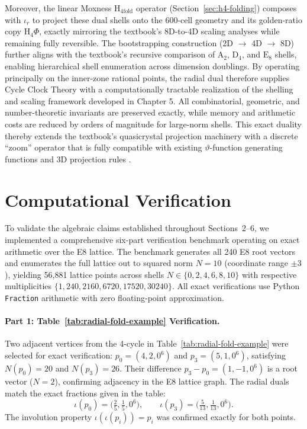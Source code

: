 \documentclass{article}
\begin{document}
Moreover, the linear Moxness \(\mathrm{H}_{4\mathrm{fold}}\) operator (Section~\ref{sec:h4-folding}) composes with \(\iota_r\) to project these dual shells onto the 600-cell geometry and its golden-ratio copy \(\mathrm{H}_4\Phi\), exactly mirroring the textbook’s 8D-to-4D scaling analyses while remaining fully reversible. The bootstrapping construction (2D \(\to\) 4D \(\to\) 8D) further aligns with the textbook’s recursive comparison of \(\mathrm{A}_2\), \(\mathrm{D}_4\), and \(\mathrm{E}_8\) shells, enabling hierarchical shell enumeration across dimension doublings.
By operating principally on the inner-zone rational points, the radial dual therefore supplies Cycle Clock Theory with a computationally tractable realization of the shelling and scaling framework developed in Chapter 5. All combinatorial, geometric, and number-theoretic invariants are preserved exactly, while memory and arithmetic costs are reduced by orders of magnitude for large-norm shells. This exact duality thereby extends the textbook’s quasicrystal projection machinery with a discrete “zoom” operator that is fully compatible with existing \(\vartheta\)-function generating functions and 3D projection rules \cite{FangIrwin2024,ClawsonFangIrwin2024}.
\section{Computational Verification}
\label{sec:computational-verification}
To validate the algebraic claims established throughout Sections~2--6, we implemented a comprehensive six-part verification benchmark operating on exact arithmetic over the E8 lattice. The benchmark generates all 240 E8 root vectors and enumerates the full lattice out to squared norm $N = 10$ (coordinate range $\pm 3$), yielding 56{,}881 lattice points across shells $N \in \{0, 2, 4, 6, 8, 10\}$ with respective multiplicities $\{1, 240, 2160, 6720, 17520, 30240\}$. All exact verifications use Python \texttt{Fraction} arithmetic with zero floating-point approximation.

\paragraph{Part 1: Table~\ref{tab:radial-fold-example} Verification.}
Two adjacent vertices from the 4-cycle in Table~\ref{tab:radial-fold-example} were selected for exact verification: $p_0 = (4,2,0^6)$ and $p_3 = (5,1,0^6)$, satisfying $N(p_0) = 20$ and $N(p_3) = 26$. Their difference $p_3 - p_0 = (1,-1,0^6)$ is a root vector ($N = 2$), confirming adjacency in the E8 lattice graph. The radial duals match the exact fractions given in the table:
\[
\iota(p_0) = \bigl(\tfrac{2}{5}, \tfrac{1}{5}, 0^6\bigr), \qquad
\iota(p_3) = \bigl(\tfrac{5}{13}, \tfrac{1}{13}, 0^6\bigr).
\]
The involution property $\iota(\iota(p_i)) = p_i$ was confirmed exactly for both points.
\end{document}
